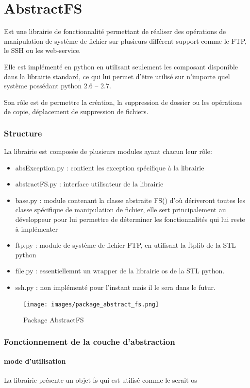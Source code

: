 \part*{AbstractFS}
Est une librairie de fonctionnalité  permettant de réaliser des opérations de manipulation de système de fichier sur plusieurs différent support comme le FTP, le SSH ou les web-service.

Elle est implémenté en python en utilisant seulement les composant disponible dans la librairie standard, ce qui lui permet d'être utilisé sur n'importe quel système possédant python 2.6 – 2.7.

Son rôle est de permettre la création, la suppression de dossier ou les opérations de copie, déplacement de suppression de fichiers.

\section*{Structure}
La librairie est composée de plusieurs modules ayant chacun leur rôle:

\begin{itemize}
\item absException.py : contient les exception spécifique à la librairie
\item abstractFS.py : interface utilisateur de la librairie
\item base.py : module contenant la classe abstraite FS() d'où dériveront toutes les classe spécifique de manipulation de fichier, elle sert principalement au développeur pour lui permettre de déterminer les fonctionnalités qui lui reste à implémenter
\item ftp.py : module de système de fichier FTP, en utilisant la ftplib de la STL python
\item file.py : essentiellemnt un wrapper de la librairie os de la STL python.
\item ssh.py : non implémenté pour l'instant mais il le sera dans le futur.
\end{itemize}

\begin{figure}[h!]
	\centering
	\texttt{[image: images/package\_abstract\_fs.png]}
	\caption{Package AbstractFS}
\end{figure}

\section*{Fonctionnement de la couche d'abstraction}
\subsection*{mode d'utilisation}
La librairie présente un objet fs qui est utilisé comme le serait os

